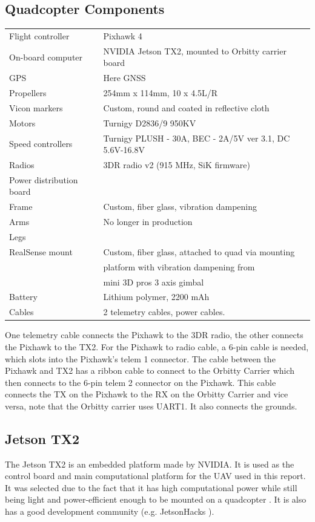 \documentclass[12pt,a4paper]{article}
\begin{document}
  \subsection{Quadcopter Components}
    \label{a: parts}
    \begin{center}
    \begin{tabular}{ l | l }
    Flight controller & Pixhawk 4 \\
    On-board computer & NVIDIA Jetson TX2, mounted to Orbitty carrier board\\
    GPS & Here GNSS\\
    Propellers & 254mm x 114mm, 10 x 4.5L/R \\
    Vicon markers & Custom, round and coated in reflective cloth \\
    Motors & Turnigy D2836/9 950KV \\
    Speed controllers & Turnigy PLUSH - 30A, BEC - 2A/5V ver 3.1, DC 5.6V-16.8V\\
    Radios & 3DR radio v2 (915 MHz, SiK firmware) \\
    Power distribution board & \\
    Frame & Custom, fiber glass, vibration dampening \\
    Arms & No longer in production \\
    Legs & \\
    RealSense mount & Custom, fiber glass, attached to quad via mounting \\
                    & platform with vibration dampening from \\
                    & mini 3D pros 3 axis gimbal \\
    Battery & Lithium polymer, 2200 mAh \\
    Cables & 2 telemetry cables, power cables. 
    \end{tabular}
    \end{center}

  \noindent
  One telemetry cable connects the Pixhawk to the 3DR radio, the other connects the Pixhawk to the TX2. For the Pixhawk to radio cable, a 6-pin cable is needed, which slots into the Pixhawk's telem 1 connector. The cable between the Pixhawk and TX2 has a ribbon cable to connect to the Orbitty Carrier which then connects to the 6-pin telem 2 connector on the Pixhawk. This cable connects the TX on the Pixhawk to the RX on the Orbitty Carrier and vice versa, note that the Orbitty carrier uses UART1. It also connects the grounds.


  \subsection{Jetson TX2}
    \label{ssec: BI TX2}
    The Jetson TX2 is an embedded platform made by NVIDIA. It is used as the control board and main computational platform for the UAV used in this report. It was selected due to the fact that it has high computational power while still being light and power-efficient enough to be mounted on a quadcopter \cite{TX2}. It is also has a good development community (e.g. JetsonHacks \cite{JetsonHacks}).
     
\end{document}
